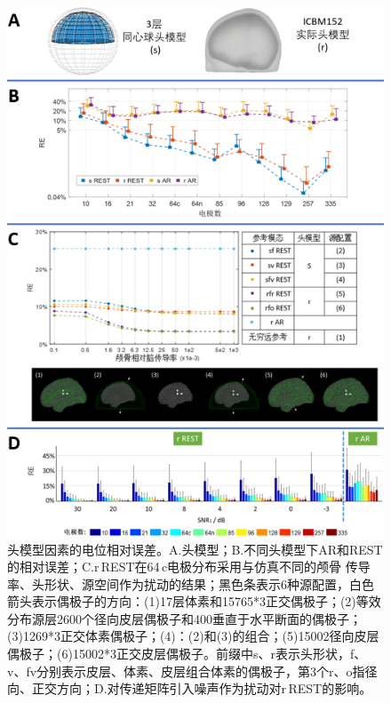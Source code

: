 \begin{figure}[!ht]
	\centering
	\includegraphics[width=12cm]{pic/JNE/figure9.png}
	\caption{头模型因素的电位相对误差。A.头模型；B.不同头模型下AR和REST的相对误差；C.r\,REST在64\,c电极分布采用与仿真不同的颅骨
	传导率、头形状、源空间作为扰动的结果；黑色条表示6种源配置，白色箭头表示偶极子的方向：(1)17层体素和15765*3正交偶极子；(2)等效分布源层2600个径向皮层偶极子和400垂直于水平断面的偶极子；(3)1269*3正交体素偶极子；(4)：(2)和(3)的组合；(5)15002径向皮层偶极子；(6)15002*3正交皮层偶极子。前缀中s、r表示头形状，f、v、fv分别表示皮层、体素、皮层组合体素的偶极子，第3个r、o指径向、正交方向；D.对传递矩阵引入噪声作为扰动对r\,REST的影响。}
	\label{2:hm}
\end{figure}
